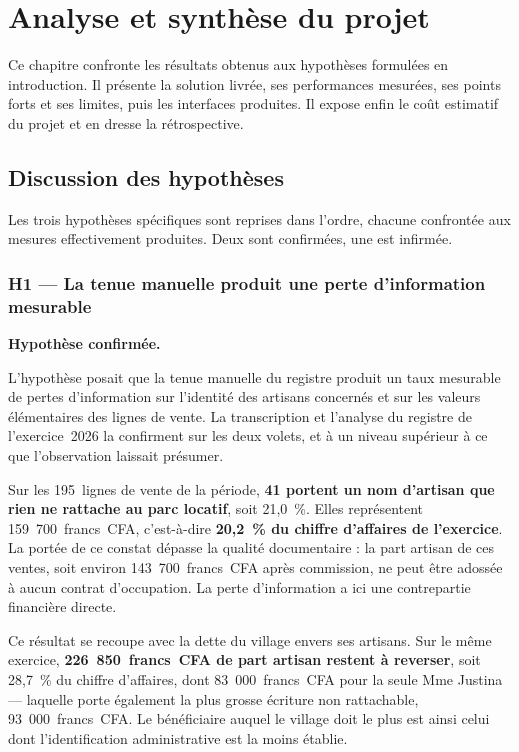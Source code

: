 \chapter{Analyse et synthèse du projet}
\label{chap:quatre}

Ce chapitre confronte les résultats obtenus aux hypothèses formulées en introduction. Il présente la solution livrée, ses performances mesurées, ses points forts et ses limites, puis les interfaces produites. Il expose enfin le coût estimatif du projet et en dresse la rétrospective.

\section{Discussion des hypothèses}
\label{sec:4-1}

Les trois hypothèses spécifiques sont reprises dans l'ordre, chacune confrontée aux mesures effectivement produites. Deux sont confirmées, une est infirmée.

\subsection{H1 --- La tenue manuelle produit une perte d'information mesurable}

\noindent\textbf{Hypothèse confirmée.}

L'hypothèse posait que la tenue manuelle du registre produit un taux mesurable de pertes d'information sur l'identité des artisans concernés et sur les valeurs élémentaires des lignes de vente. La transcription et l'analyse du registre de l'exercice~2026 la confirment sur les deux volets, et à un niveau supérieur à ce que l'observation laissait présumer.

Sur les 195~lignes de vente de la période, \textbf{41 portent un nom d'artisan que rien ne rattache au parc locatif}, soit 21,0~\%. Elles représentent 159~700~francs~CFA, c'est-à-dire \textbf{20,2~\% du chiffre d'affaires de l'exercice}. La portée de ce constat dépasse la qualité documentaire : la part artisan de ces ventes, soit environ 143~700~francs~CFA après commission, ne peut être adossée à aucun contrat d'occupation. La perte d'information a ici une contrepartie financière directe.

Ce résultat se recoupe avec la dette du village envers ses artisans. Sur le même exercice, \textbf{226~850~francs~CFA de part artisan restent à reverser}, soit 28,7~\% du chiffre d'affaires, dont 83~000~francs~CFA pour la seule Mme Justina --- laquelle porte également la plus grosse écriture non rattachable, 93~000~francs~CFA. Le bénéficiaire auquel le village doit le plus est ainsi celui dont l'identification administrative est la moins établie.

